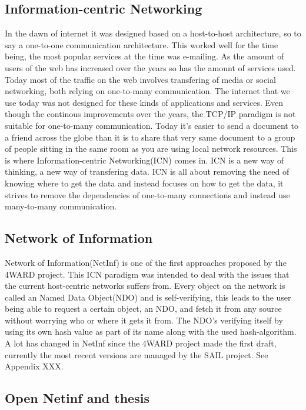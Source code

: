 \subsection{Information-centric Networking}
In the dawn of internet it was designed based on a host-to-host architecture, so to say a one-to-one communication architecture. This worked well for the time being, the most popular services at the time was e-mailing. As the amount of users of the web has increased over the years so has the amount of services used. Today most of the traffic on the web involves transfering of media or social networking, both relying on one-to-many communication. The internet that we use today was not designed for these kinds of applications and services. 
Even though the continous improvements over the years, the TCP/IP paradigm is not suitable for one-to-many communication. 
Today it's easier to send a document to a friend across the globe than it is to share that very same document to a group of people sitting in the same room as you are using local network resources\cite{ICNarticle}.
This is where Information-centric Networking(ICN) comes in. ICN is a new way of thinking, a new way of transfering data. ICN is all about removing the need of knowing where to get the data and instead focuses on how to get the data\cite{ICNarticle}, it strives to remove the dependencies of one-to-many connections and instead use many-to-many communication.

\subsection{Network of Information}
Network of Information(NetInf) is one of the first approaches proposed by the 4WARD project. \cite{4ward} This ICN paradigm was intended to deal with the issues that the current host-centric networks suffers from. Every object on the network is called an Named Data Object(NDO) and is self-verifying, this leads to the user being able to request a certain object, an NDO, and fetch it from any source without worrying who or where it gets it from. The NDO's verifying itself by using its own hash value as part of its name along with the used hash-algorithm.
A lot has changed in NetInf since the 4WARD project made the first draft, currently the most recent versions are managed by the SAIL project. See Appendix XXX.

\subsection{Open Netinf and thesis}
